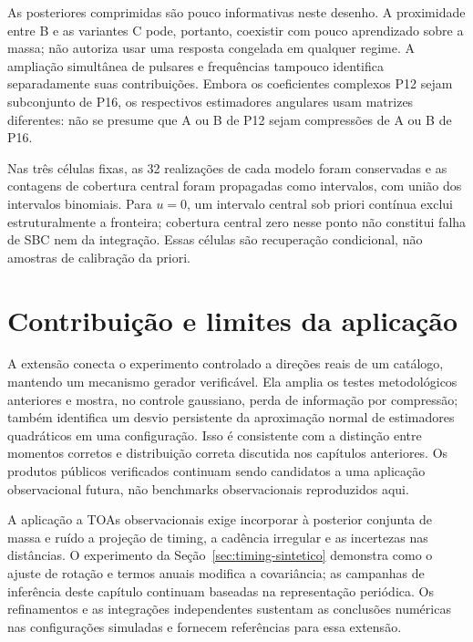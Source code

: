As posteriores comprimidas são pouco informativas neste desenho. A proximidade entre B e as variantes C pode, portanto, coexistir com pouco aprendizado sobre a massa; não autoriza usar uma resposta congelada em qualquer regime. A ampliação simultânea de pulsares e frequências tampouco identifica separadamente suas contribuições. Embora os coeficientes complexos P12 sejam subconjunto de P16, os respectivos estimadores angulares usam matrizes diferentes: não se presume que A ou B de P12 sejam compressões de A ou B de P16.

Nas três células fixas, as 32 realizações de cada modelo foram conservadas e as contagens de cobertura central foram propagadas como intervalos, com união dos intervalos binomiais. Para $u=0$, um intervalo central sob priori contínua exclui estruturalmente a fronteira; cobertura central zero nesse ponto não constitui falha de SBC nem da integração. Essas células são recuperação condicional, não amostras de calibração da priori.



\section{Contribuição e limites da aplicação}

A extensão conecta o experimento controlado a direções reais de um catálogo, mantendo um mecanismo gerador verificável. Ela amplia os testes metodológicos anteriores e mostra, no controle gaussiano, perda de informação por compressão; também identifica um desvio persistente da aproximação normal de estimadores quadráticos em uma configuração. Isso é consistente com a distinção entre momentos corretos e distribuição correta discutida nos capítulos anteriores. Os produtos públicos verificados continuam sendo candidatos a uma aplicação observacional futura, não benchmarks observacionais reproduzidos aqui.

A aplicação a TOAs observacionais exige incorporar à posterior conjunta
de massa e ruído a projeção de timing, a cadência irregular e as
incertezas nas distâncias. O experimento da
Seção~\ref{sec:timing-sintetico} demonstra como o ajuste de rotação e
termos anuais modifica a covariância; as campanhas de inferência deste
capítulo continuam baseadas na representação periódica. Os refinamentos
e as integrações independentes sustentam as conclusões numéricas nas
configurações simuladas e fornecem referências para essa extensão.

